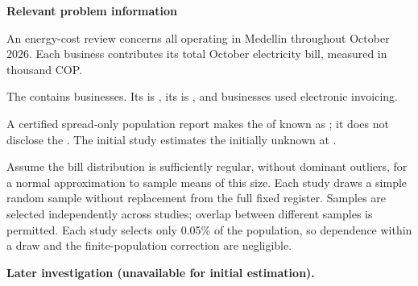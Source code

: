 \secInicio[][sec:p1]

\clearpage



\textbf{Relevant problem information}

\begin{probleminfoexcerpt}
An energy-cost review concerns all     operating in Medellin throughout October 2026. Each business contributes its total October electricity bill, measured in thousand COP.
\end{probleminfoexcerpt}

\begin{probleminfoexcerpt}
The     contains  businesses. Its   is   , its    is   , and  businesses used electronic invoicing.
\end{probleminfoexcerpt}

\begin{probleminfoexcerpt}
A certified spread-only population report makes the    of  known as   ; it does not disclose the   . The initial study estimates the initially unknown   at  .
\end{probleminfoexcerpt}

\begin{probleminfoexcerpt}
Assume the bill distribution is sufficiently regular, without dominant outliers, for a normal approximation to sample means of this size. Each study draws a simple random sample without replacement from the full fixed register. Samples are selected independently across studies; overlap between different samples is permitted. Each study selects only 0.05\% of the population, so dependence within a draw and the finite-population correction are negligible.
\end{probleminfoexcerpt}

\textbf{Later investigation (unavailable for initial estimation).}

